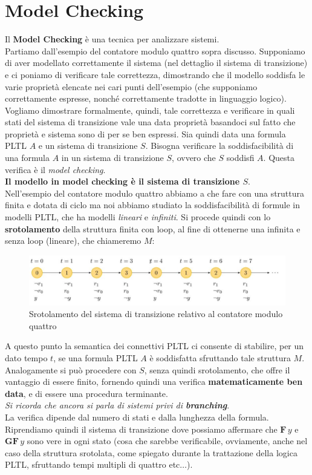 \documentclass[a4paper,12pt, oneside]{book}
\begin{document}
\section{Model Checking}
Il \textbf{Model Checking} è una tecnica per analizzare sistemi.\\
Partiamo dall'esempio del contatore modulo quattro sopra discusso. Supponiamo di
aver modellato correttamente il sistema (nel dettaglio il sistema di
transizione) e ci poniamo di verificare tale correttezza, dimostrando che il
modello soddisfa le varie proprietà elencate nei cari punti dell'esempio (che
supponiamo correttamente espresse, nonché correttamente tradotte in linguaggio
logico). Vogliamo dimostrare formalmente, quindi, tale correttezza e verificare
in quali stati del sistema di transizione vale una data proprietà basandoci sul
fatto che proprietà e sistema sono di per se ben espressi. Sia quindi data una
formula PLTL $A$ e un sistema di transizione $S$. Bisogna verificare la
soddisfacibilità di una formula $A$ in un sistema di transizione $S$, ovvero che
$S$ soddisfi $A$. Questa verifica è il \textit{model checking}.\\
\textbf{Il modello in model checking è il sistema di transizione $S$}.\\
Nell'esempio del contatore modulo quattro abbiamo a che fare con una struttura
finita e dotata di ciclo ma noi abbiamo studiato la soddisfacibilità di formule
in modelli PLTL, che ha modelli \textit{lineari} e \textit{infiniti}. Si procede
quindi con lo \textbf{srotolamento} della struttura finita con loop, al fine di
ottenerne una infinita e senza loop (lineare), che chiameremo $M$:
\begin{figure}[H]
  \centering
  \includegraphics[scale = 0.4]{img/sro.jpg}
  \caption{Srotolamento del sistema di transizione relativo al contatore modulo
    quattro} 
\end{figure}
A questo punto la semantica dei connettivi PLTL ci consente di stabilire, per un
dato tempo $t$, se una formula PLTL $A$ è soddisfatta sfruttando tale struttura
$M$. Analogamente si può procedere con $S$, senza quindi srotolamento, che offre
il vantaggio di essere finito, fornendo quindi una verifica
\textbf{matematicamente ben data}, e di essere una procedura terminante.\\
\textit{Si ricorda che ancora si parla di sistemi privi di
  \textbf{branching}}.\\
La verifica dipende dal numero di stati e dalla lunghezza della formula.\\
Riprendiamo quindi il sistema di transizione dove possiamo affermare che
$\mathbf{F}\,y$ e $\mathbf{GF}\,y$ sono vere in ogni stato (cosa che sarebbe
verificabile, ovviamente, anche nel caso della struttura srotolata, come
spiegato durante la trattazione della logica PLTL, sfruttando tempi multipli di
quattro etc$\ldots$).
\end{document}
